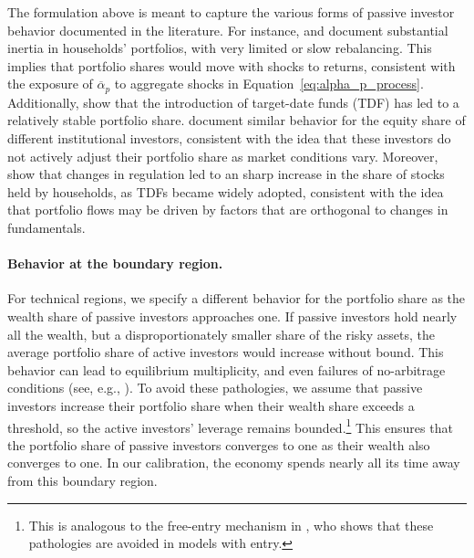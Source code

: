 The formulation above is meant to capture the various forms of passive investor behavior documented in the literature. 
For instance, \citet{ameriks2011household} and \citet{brunnermeier2008wealth} document substantial inertia in households' portfolios, with very limited or slow rebalancing. This implies that portfolio shares would move with shocks to returns, consistent with the exposure of $\overline{\alpha}_p$ to aggregate shocks in Equation~\eqref{eq:alpha_p_process}. 
Additionally, \citet{parker2023retail} show that the introduction of target-date funds (TDF) has led to a relatively stable portfolio share.  \citet{gabaix2020search} document similar behavior for the equity share of different institutional investors, consistent with the idea that these investors do not actively adjust their portfolio share as market conditions vary.
Moreover, \citet{parker2022household} show that changes in regulation led to an sharp increase in the share of stocks held by households, as TDFs became widely adopted, consistent with the idea that portfolio flows may be driven by factors that are orthogonal to changes in fundamentals. 

\paragraph{Behavior at the boundary region.} For technical regions, we specify a different behavior for the portfolio share as the wealth share of passive investors approaches one. 
If passive investors hold nearly all the wealth, but a disproportionately smaller share of the risky assets, the average portfolio share of active investors would increase without bound. 
This behavior can lead to equilibrium multiplicity, and even failures of no-arbitrage conditions (see, e.g., \citealt{hugonnier2012rational}). 
To avoid these pathologies, we assume that passive investors increase their portfolio share when their wealth share exceeds a threshold, so the active investors' leverage remains bounded.\footnote{This is analogous to the free-entry mechanism in \citet{khorrami2022entry}, who shows that these pathologies are avoided in models with entry. } 
This ensures that the portfolio share of passive investors converges to one as their wealth also converges to one. 
In our calibration, the economy spends nearly all its time away from this boundary region.  






